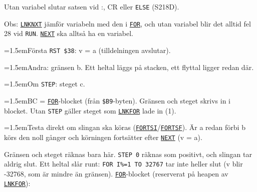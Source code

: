 \begin{Listing}
\begin{Cmt}
\begin{Verb}
\end{Verb}
\par\noindent Utan variabel slutar satsen vid {}:{}, CR eller \texttt{ELSE} (S218D).\par
\par\noindent Obs: \hyperlink{l:LNKNXT}{\texttt{LNKNXT}} jämför variabeln med den i \hyperlink{l:FOR}{\texttt{FOR}}, och utan variabel blir det alltid fel 28 vid \texttt{RUN}. \hyperlink{l:NEXT}{\texttt{NEXT}} ska alltså ha en variabel.\par\end{Cmt}
\Gap
{}
\begin{Note}\par\noindent\hangindent=1.5emFörsta \texttt{RST \$38}: v = a (tilldelningen avslutar).\par
\par\noindent\hangindent=1.5emAndra: gränsen b. Ett heltal läggs på stacken, ett flyttal ligger redan där.\par
\par\noindent\hangindent=1.5emOm \texttt{STEP}: steget c.\par
\par\noindent\hangindent=1.5emBC = \hyperlink{l:FOR}{\texttt{FOR}}-blocket (från \texttt{\$B9}-byten). Gränsen och steget skrivs in i blocket. Utan \texttt{STEP} gäller steget som \hyperlink{l:LNKFOR}{\texttt{LNKFOR}} lade in (1).\par
\par\noindent\hangindent=1.5emTesta direkt om slingan ska köras (\hyperlink{l:FORTSI}{\texttt{FORTSI}}/\hyperlink{l:FORTSF}{\texttt{FORTSF}}). Är a redan förbi b körs den noll gånger och körningen fortsätter efter \hyperlink{l:NEXT}{\texttt{NEXT}} (v = a).\par
\par\noindent Gränsen och steget räknas bara här. \texttt{STEP 0} räknas som positivt, och slingan tar aldrig slut. Ett heltal slår runt: \texttt{FOR I\%=1 TO 32767} tar inte heller slut (v blir \mbox{-}32768, som är mindre än gränsen). \hyperlink{l:FOR}{\texttt{FOR}}-blocket (reserverat på heapen av \hyperlink{l:LNKFOR}{\texttt{LNKFOR}}):\par

\end{Note}
\end{Listing}
